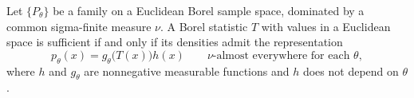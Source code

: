 \begin{theorem}
Let $\{P_\theta\}$ be a family on a Euclidean Borel sample space, dominated
by a common sigma-finite measure $\nu$. A Borel statistic $T$ with values in
a Euclidean space is sufficient if and only if its densities admit the
representation
\begin{equation}
p_\theta(x)=g_\theta\bigl(T(x)\bigr)h(x)
\qquad \nu\text{-almost everywhere for each }\theta,
\tag{10}
\end{equation}
where $h$ and $g_\theta$ are nonnegative measurable functions and $h$ does
not depend on $\theta$.
\end{theorem}

\newpage